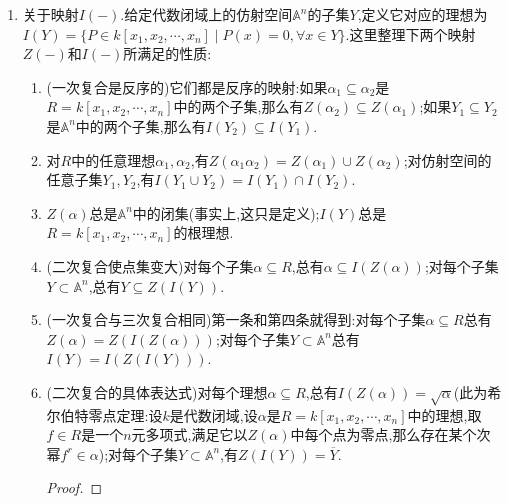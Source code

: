 \begin{enumerate}
\begin{enumerate}
\begin{proof}
    		假设$X\times Y$是可约的,那么它存在真闭子集$Z_1,Z_2$,满足并集是整个$X\times Y$.那么对任意$x\in X$,有$X\times Y$的闭子集$\{x\}\times Y$同构于$Y$,从而也是不可约的,于是从$\left(\{x\}\times Y\right)\cap Z_1$和$\left(\{x\}\times Y\right)\cap Z_2$都是$\{x\}\times Y$的闭子集,并且并是整个$\{x\}\times Y$,就说明要么$\{x\}\times Y\subseteq Z_1$,要么$\{x\}\times Y\subseteq Z_2$.我们用$X_1$表示那些满足前一个式子的$x\in X$构成的子集,用$X_2$表示那些满足后一个式子的$x\in X$构成的子集.下面说明$X_1$是闭集,为此只需说明$X_y=\{x\in X\mid(x,y)\in Z_1\}$是闭集,就有$X_1=\cap_{y\in Y}X_y$是闭集.但是因为$\left(X\times\{y\}\right)\cap Z_1=X_y\times y$得到$X_y\times\{y\}$是$X\times\{y\}$的闭集,在同构下就得到$X_y$是$X$的闭集.同理我们得到$X_2$也是闭集,于是按照$X$是不可约的得到$X_1=X$或者$X_2=X$,前者得到$X\times Y=Z_1$,后者得到$X\times Y=Z_2$,于是$X\times Y$是不可约的.
    	\end{proof}
    \end{enumerate}
    \item 关于映射$I(-)$.给定代数闭域上的仿射空间$\mathbb{A}^n$的子集$Y$,定义它对应的理想为$I(Y)=\{P\in k[x_1,x_2,\cdots,x_n]\mid P(x)=0,\forall x\in Y\}$.这里整理下两个映射$Z(-)$和$I(-)$所满足的性质:
    \begin{enumerate}
    	\item (一次复合是反序的)它们都是反序的映射:如果$\alpha_1\subseteq \alpha_2$是$R=k[x_1,x_2,\cdots,x_n]$中的两个子集,那么有$Z(\alpha_2)\subseteq Z(\alpha_1)$;如果$Y_1\subseteq Y_2$是$\mathbb{A}^n$中的两个子集,那么有$I(Y_2)\subseteq I(Y_1)$.
    	\item 对$R$中的任意理想$\alpha_1,\alpha_2$,有$Z(\alpha_1\alpha_2)=Z(\alpha_1)\cup Z(\alpha_2)$;对仿射空间的任意子集$Y_1,Y_2$,有$I(Y_1\cup Y_2)=I(Y_1)\cap I(Y_2)$.
    	\item $Z(\alpha)$总是$\mathbb{A}^n$中的闭集(事实上,这只是定义);$I(Y)$总是$R=k[x_1,x_2,\cdots,x_n]$的根理想.
    	\item (二次复合使点集变大)对每个子集$\alpha\subseteq R$,总有$\alpha\subseteq I(Z(\alpha))$;对每个子集$Y\subset\mathbb{A}^n$,总有$Y\subseteq Z(I(Y))$.
    	\item (一次复合与三次复合相同)第一条和第四条就得到:对每个子集$\alpha\subseteq R$总有$Z(\alpha)=Z(I(Z(\alpha)))$;对每个子集$Y\subset\mathbb{A}^n$总有$I(Y)=I(Z(I(Y)))$.
    	\item (二次复合的具体表达式)对每个理想$\alpha\subseteq R$,总有$I(Z(\alpha))=\sqrt{\alpha}$(此为希尔伯特零点定理:设$k$是代数闭域,设$\alpha$是$R=k[x_1,x_2,\cdots,x_n]$中的理想,取$f\in R$是一个$n$元多项式,满足它以$Z(\alpha)$中每个点为零点,那么存在某个次幂$f^r\in\alpha$);对每个子集$Y\subset\mathbb{A}^n$,有$Z(I(Y))=\overline{Y}$.
    	\begin{proof}
    		

\end{proof}
\end{enumerate}
\end{enumerate}

